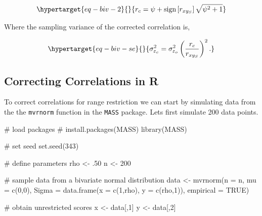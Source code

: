 \documentclass[
  letterpaper,
  DIV=11,
  numbers=noendperiod]{scrreprt}
\newenvironment{Shaded}{\begin{snugshade}}{\end{snugshade}}
\newcommand{\AttributeTok}[1]{\textcolor[rgb]{0.40,0.45,0.13}{#1}}
\newcommand{\CommentTok}[1]{\textcolor[rgb]{0.37,0.37,0.37}{#1}}
\newcommand{\ConstantTok}[1]{\textcolor[rgb]{0.56,0.35,0.01}{#1}}
\newcommand{\DecValTok}[1]{\textcolor[rgb]{0.68,0.00,0.00}{#1}}
\newcommand{\FunctionTok}[1]{\textcolor[rgb]{0.28,0.35,0.67}{#1}}
\newcommand{\NormalTok}[1]{\textcolor[rgb]{0.00,0.23,0.31}{#1}}
\newcommand{\OtherTok}[1]{\textcolor[rgb]{0.00,0.23,0.31}{#1}}
\begin{document}
\begin{equation}\protect\hypertarget{eq-biv-2}{}{
r_c = \psi + \text{sign}\left[r_{xy_S}\right]\sqrt{\psi^2+1}
}\label{eq-biv-2}\end{equation}

Where the sampling variance of the corrected correlation is,

\begin{equation}\protect\hypertarget{eq-biv-se}{}{
\sigma^2_{\varepsilon_c} = \sigma^2_{\varepsilon_o}\left(\frac{r_c}{r_{xy_S}}\right)^2.
}\label{eq-biv-se}\end{equation}

\hypertarget{correcting-correlations-in-r-1}{%
\subsection{Correcting Correlations in
R}\label{correcting-correlations-in-r-1}}

To correct correlations for range restriction we can start by simulating
data from the the \texttt{mvrnorm} function in the \texttt{MASS}
package. Lets first simulate 200 data points.

\begin{Shaded}
\begin{Highlighting}[]
\CommentTok{\# load packages}
\CommentTok{\# install.packages(\textquotesingle{}MASS\textquotesingle{})}
\FunctionTok{library}\NormalTok{(MASS)}

\CommentTok{\# set seed}
\FunctionTok{set.seed}\NormalTok{(}\DecValTok{343}\NormalTok{)}

\CommentTok{\# define parameters }
\NormalTok{rho }\OtherTok{\textless{}{-}}\NormalTok{ .}\DecValTok{50}
\NormalTok{n }\OtherTok{\textless{}{-}} \DecValTok{200}

\CommentTok{\# sample data from a bivariate normal distribution}
\NormalTok{data }\OtherTok{\textless{}{-}} \FunctionTok{mvrnorm}\NormalTok{(}\AttributeTok{n =}\NormalTok{ n,}
                \AttributeTok{mu =} \FunctionTok{c}\NormalTok{(}\DecValTok{0}\NormalTok{,}\DecValTok{0}\NormalTok{),}
                \AttributeTok{Sigma =} \FunctionTok{data.frame}\NormalTok{(}\AttributeTok{x =} \FunctionTok{c}\NormalTok{(}\DecValTok{1}\NormalTok{,rho),}
                                  \AttributeTok{y =} \FunctionTok{c}\NormalTok{(rho,}\DecValTok{1}\NormalTok{)),}
                \AttributeTok{empirical =} \ConstantTok{TRUE}\NormalTok{)}

\CommentTok{\# obtain unrestricted scores}
\NormalTok{x }\OtherTok{\textless{}{-}}\NormalTok{ data[,}\DecValTok{1}\NormalTok{]}
\NormalTok{y }\OtherTok{\textless{}{-}}\NormalTok{ data[,}\DecValTok{2}\NormalTok{]}
\end{Highlighting}
\end{Shaded}
\end{document}
